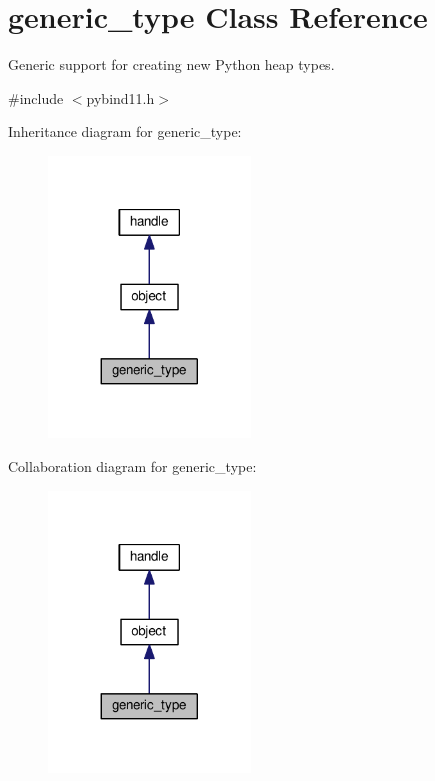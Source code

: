 \hypertarget{classgeneric__type}{}\section{generic\+\_\+type Class Reference}
\label{classgeneric__type}


Generic support for creating new Python heap types.  




{\ttfamily \#include $<$pybind11.\+h$>$}



Inheritance diagram for generic\+\_\+type\+:
\nopagebreak
\begin{figure}[H]
\begin{center}
\leavevmode
\includegraphics[width=152pt]{classgeneric__type__inherit__graph}
\end{center}
\end{figure}


Collaboration diagram for generic\+\_\+type\+:
\nopagebreak
\begin{figure}[H]
\begin{center}
\leavevmode
\includegraphics[width=152pt]{classgeneric__type__coll__graph}
\end{center}
\end{figure}
